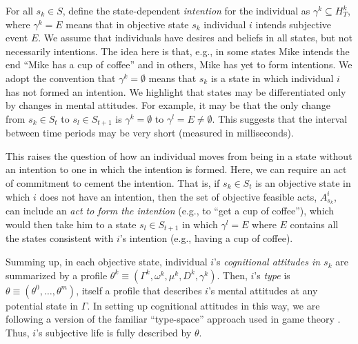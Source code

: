 \documentclass[
11pt,
titlepage,
reqno,
]{article}%
\theoremstyle{definition}
\begin{document}
For all $s_k\in S$, define the state-dependent \textit{intention} for the individual as $\gamma^k\subseteq H^k_T$, where $\gamma^k=E$ means that in objective state $s_k$ individual $i$ intends subjective event $E$. 
We assume that individuals have desires and beliefs in all states, but not necessarily intentions. 
The idea here is that, e.g., in some states Mike intends the end ``Mike has a cup of coffee'' and in others, Mike has yet to form intentions.
We adopt the convention that $\gamma^k=\emptyset$ means that $s_k$ is a state in which individual $i$ has not formed an intention. 
We highlight that states may be differentiated only by changes in mental attitudes. 
For example, it may be that the only change from $s_k\in S_t$ to $s_l\in S_{t+1}$ is $\gamma^k=\emptyset$ to $\gamma^l=E\ne\emptyset$.
This suggests that the interval between time periods may be very short (measured in milliseconds).
	
This raises the question of how an individual moves from being in a state without an intention to one in which the intention is formed. 
Here, we can require an act of commitment to cement the intention. 
That is, if $s_k\in S_t$ is an objective state in which $i$ does not have an intention, then the set of objective feasible acts, $A^i_{s_k}$, can include an \textit{act to form the intention} (e.g., to ``get a cup of coffee''), which would then take him to a state $s_l\in S_{t+1}$ in which $\gamma^l=E$ where $E$ contains all the states consistent with $i$'s intention (e.g., having a cup of coffee).
	
Summing up, in each objective state, individual $i$'s \textit{cognitional attitudes in $s_k$} are summarized by a profile $\theta^k\equiv(\Gamma^k,\omega^k,\mu^k,D^k,\gamma^k)$.
Then, $i$'s \textit{type} is $\theta\equiv(\theta^0,\ldots,\theta^m)$, itself a profile that describes $i$'s mental attitudes at any potential state in $\Gamma$.
In setting up cognitional  attitudes in this way, we are following a version of the familiar ``type-space'' approach used in game theory \citep[See][]{Harsanyi1967, Mertens1985a}. 
Thus, $i$'s subjective life  is fully described by $\theta$.
	
\end{document}
